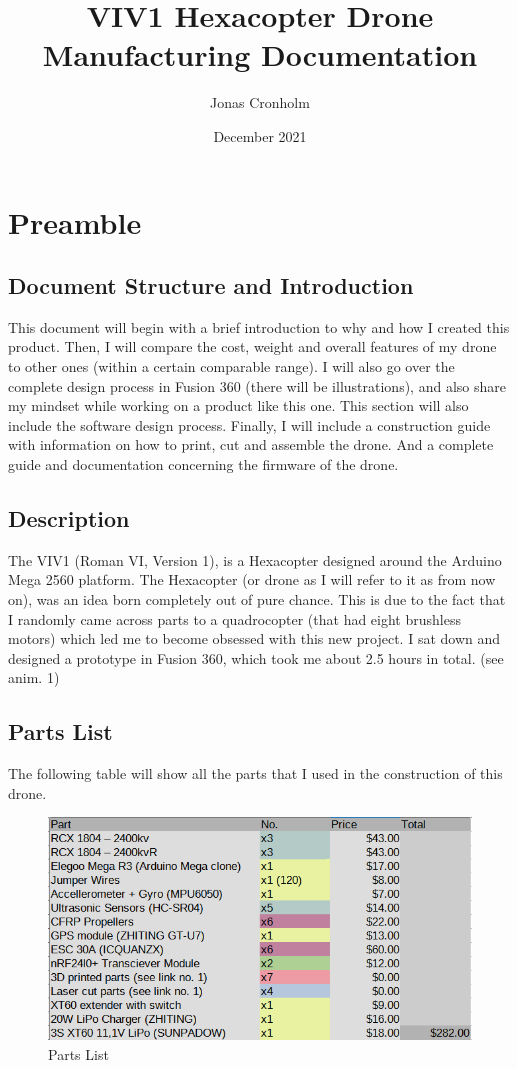 \documentclass{hitec}
\title{VIV1 Hexacopter Drone Manufacturing Documentation}
\author{Jonas Cronholm}
\date{December 2021}
\begin{document}
	\maketitle
	\pagebreak
	\tableofcontents
	\pagebreak
	\section{Preamble}
	\subsection{Document Structure and Introduction}
	This document will begin with a brief introduction to why and how I created this product. Then, I will compare the cost, weight and overall features of my drone to other ones (within a certain comparable range). 
	I will also go over the complete design process in Fusion 360 (there will be illustrations), and also share my mindset while working on a product like this one. This section will also include the software design process.
	Finally, I will include a construction guide with information on how to print, cut and assemble the drone. And a complete guide and documentation concerning the firmware of the drone. \newline  
	\subsection{Description}
	The VIV1 (Roman VI, Version 1), is a Hexacopter designed around the Arduino Mega 2560 platform. The Hexacopter (or drone as I will refer to it as from now on), was an idea born completely out of pure chance. This is due to the fact that I randomly came across parts to a quadrocopter (that had eight brushless motors) which led me to become obsessed with this new project. I sat down and designed a prototype in Fusion 360, which took me about 2.5 hours in total. (see anim. 1)
	\pagebreak
	
	\subsection{Parts List}
	The following table will show all the parts that I used in the construction of this drone.
	\begin{figure}[h]
		\centering
		\includegraphics[width=\linewidth]{parts}
		\caption{Parts List}
		\label{fig:pl}
	\end{figure}
\end{document}
